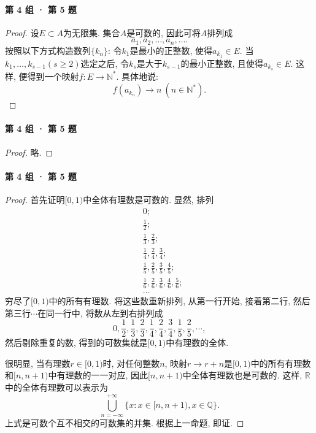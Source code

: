 \documentclass[UTF8,11pt, a4paper, oneside, fontset=none]{ctexbook}
\begin{document}
\paragraph{第 4 组 · 第 5 题}
\begin{proof}
设$E \subset A$为无限集. 集合$A$是可数的, 因此可将$A$排列成
\[
a_1, a_2, \ldots, a_n, \ldots.
\]
按照以下方式构造数列$\{ k_n \}$: 令$k_1$是最小的正整数, 使得$a_{k_1} \in E$. 当$k_1, \ldots, k_{s-1}(s \geq 2)$选定之后, 令$k_s$是大于$k_{s-1}$的最小正整数, 且使得$a_{k_s} \in E$. 这样, 便得到一个映射$f : E \to \mathbb N^*$. 具体地说:
\[
f(a_{k_n}) \to n \ (n \in \mathbb N^*).
\]
\end{proof}

\paragraph{第 4 组 · 第 5 题}
\begin{proof}
略.
\end{proof}

\paragraph{第 4 组 · 第 5 题}
\begin{proof}

首先证明$[0, 1)$中全体有理数是可数的. 显然, 排列
\begin{align*}
&0;\\
&\frac{1}{2};\\
&\frac{1}{3}, \frac{2}{3};\\
&\frac{1}{4}, \frac{2}{4}, \frac{3}{4};\\
&\frac{1}{5}, \frac{2}{5}, \frac{3}{5}, \frac{4}{5};\\
&\frac{1}{6}, \frac{2}{6}, \frac{3}{6}, \frac{4}{6}, \frac{5}{6};\\
&\ldots
\end{align*}
穷尽了$[0, 1)$中的所有有理数. 将这些数重新排列, 从第一行开始, 接着第二行, 然后第三行$\cdots$在同一行中, 将数从左到右排列成
\[
0, \frac{1}{2}, \frac{1}{3}, \frac{2}{3}, \frac{1}{4}, \frac{2}{4}, \frac{3}{4}, \frac{1}{5}, \frac{2}{5}, \cdots, 
\]
然后剔除重复的数, 得到的可数集就是$[0, 1)$中有理数的全体.


很明显, 当有理数$r \in [0, 1)$时, 对任何整数$n$, 映射$r \to r +n$是$[0, 1)$中的所有有理数和$[n, n+1)$中有理数的一一对应, 因此$[n, n+1)$中全体有理数也是可数的. 这样, $\mathbb R$中的全体有理数可以表示为
\[
\bigcup_{n=-\infty}^{+\infty} \{x: x \in[n, n+1), x \in \mathbb Q\}.
\]
上式是可数个互不相交的可数集的并集. 根据上一命题, 即证.
\end{proof}
\end{document}

